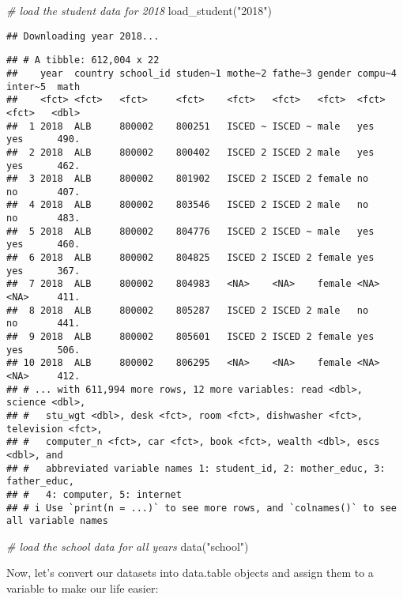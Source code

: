 \documentclass[
]{article}
\newenvironment{Shaded}{\begin{snugshade}}{\end{snugshade}}
\newcommand{\CommentTok}[1]{\textcolor[rgb]{0.56,0.35,0.01}{\textit{#1}}}
\newcommand{\FunctionTok}[1]{\textcolor[rgb]{0.00,0.00,0.00}{#1}}
\newcommand{\NormalTok}[1]{#1}
\newcommand{\StringTok}[1]{\textcolor[rgb]{0.31,0.60,0.02}{#1}}
\begin{document}
\begin{Shaded}
\begin{Highlighting}[]
\CommentTok{\# load the student data for 2018}
\FunctionTok{load\_student}\NormalTok{(}\StringTok{"2018"}\NormalTok{) }
\end{Highlighting}
\end{Shaded}

\begin{verbatim}
## Downloading year 2018...
\end{verbatim}

\begin{verbatim}
## # A tibble: 612,004 x 22
##    year  country school_id studen~1 mothe~2 fathe~3 gender compu~4 inter~5  math
##    <fct> <fct>   <fct>     <fct>    <fct>   <fct>   <fct>  <fct>   <fct>   <dbl>
##  1 2018  ALB     800002    800251   ISCED ~ ISCED ~ male   yes     yes      490.
##  2 2018  ALB     800002    800402   ISCED 2 ISCED 2 male   yes     yes      462.
##  3 2018  ALB     800002    801902   ISCED 2 ISCED 2 female no      no       407.
##  4 2018  ALB     800002    803546   ISCED 2 ISCED 2 male   no      no       483.
##  5 2018  ALB     800002    804776   ISCED 2 ISCED ~ male   yes     yes      460.
##  6 2018  ALB     800002    804825   ISCED 2 ISCED 2 female yes     yes      367.
##  7 2018  ALB     800002    804983   <NA>    <NA>    female <NA>    <NA>     411.
##  8 2018  ALB     800002    805287   ISCED 2 ISCED 2 male   no      no       441.
##  9 2018  ALB     800002    805601   ISCED 2 ISCED 2 female yes     yes      506.
## 10 2018  ALB     800002    806295   <NA>    <NA>    female <NA>    <NA>     412.
## # ... with 611,994 more rows, 12 more variables: read <dbl>, science <dbl>,
## #   stu_wgt <dbl>, desk <fct>, room <fct>, dishwasher <fct>, television <fct>,
## #   computer_n <fct>, car <fct>, book <fct>, wealth <dbl>, escs <dbl>, and
## #   abbreviated variable names 1: student_id, 2: mother_educ, 3: father_educ,
## #   4: computer, 5: internet
## # i Use `print(n = ...)` to see more rows, and `colnames()` to see all variable names
\end{verbatim}

\begin{Shaded}
\begin{Highlighting}[]
\CommentTok{\# load the school data for all years}
\FunctionTok{data}\NormalTok{(}\StringTok{"school"}\NormalTok{)}
\end{Highlighting}
\end{Shaded}

Now, let's convert our datasets into data.table objects and assign them
to a variable to make our life easier:
\end{document}
